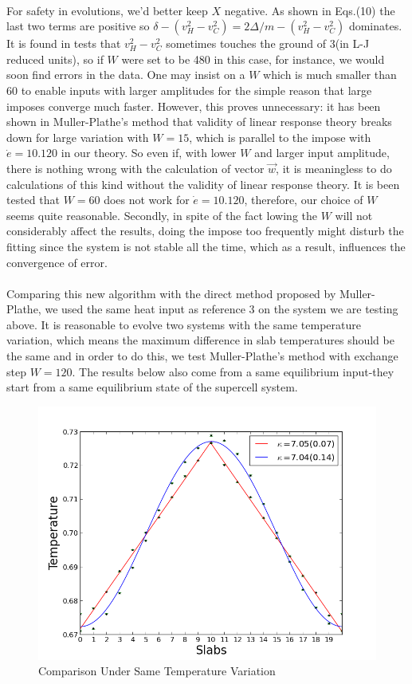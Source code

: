 \documentclass[twocolumn]{article}
\begin{document}
\paragraph*{}
For safety in evolutions, we'd better keep $X$ negative. As shown in Eqs.(10) the last two terms are positive so $\delta-(v_H^2-v_C^2)=2\Delta/m-(v_H^2-v_C^2)$ dominates. It is found in tests that $v_H^2-v_C^2$ sometimes touches the ground of 3(in L-J reduced units), so if $W$ were set to be 480 in this case, for instance, we would soon find errors in the data. One may insist on a $W$ which is much smaller than 60 to enable inputs with larger amplitudes for the simple reason that large imposes converge much faster. However, this proves unnecessary: it has been shown in Muller-Plathe's method that validity of linear response theory breaks down for large variation with $W=15$, which is parallel to the impose with  $\dot{e}=10.120$ in our theory. So even if, with lower $W$ and larger input amplitude, there is nothing wrong with the calculation of vector $\vec{w}$, it is meaningless to do calculations of this kind without the validity of linear response theory. It is been tested that $W=60$ does not work for $\dot{e}=10.120$, therefore, our choice of $W$ seems quite reasonable. Secondly, in spite of the fact lowing the $W$ will not considerably affect the results, doing the impose too frequently might disturb the fitting since the system is not stable all the time, which as a result, influences the convergence of error.
\paragraph*{}
Comparing this new algorithm with the direct method proposed by Muller-Plathe, we used the same heat input as reference 3 on the system we are testing above. It is reasonable to evolve two systems with the same temperature variation, which means the maximum difference in slab temperatures should be the same and in order to do this, we test Muller-Plathe's method with exchange step $W=120$. The results below also come from a same equilibrium input-they start from a same equilibrium state of the supercell system.
\begin{figure}[h]
\centering
  \includegraphics[width=\linewidth]{amplitude.png}
\caption{Comparison Under Same Temperature Variation}
\end{figure}
\end{document}
